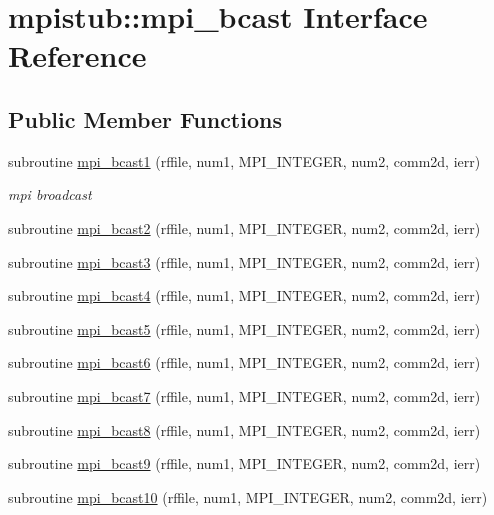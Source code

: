\hypertarget{interfacempistub_1_1mpi__bcast}{}\section{mpistub\+::mpi\+\_\+bcast Interface Reference}
\label{interfacempistub_1_1mpi__bcast}
\subsection*{Public Member Functions}
\begin{DoxyCompactItemize}
\item 
subroutine \mbox{\hyperlink{interfacempistub_1_1mpi__bcast_a8a625c502574a57694e059e09a85905c}{mpi\+\_\+bcast1}} (rffile, num1, M\+P\+I\+\_\+\+I\+N\+T\+E\+G\+ER, num2, comm2d, ierr)
\begin{DoxyCompactList}\small\item\em mpi broadcast \end{DoxyCompactList}\item 
subroutine \mbox{\hyperlink{interfacempistub_1_1mpi__bcast_aaa0cc632dc25d1d3c5757c751024f9b2}{mpi\+\_\+bcast2}} (rffile, num1, M\+P\+I\+\_\+\+I\+N\+T\+E\+G\+ER, num2, comm2d, ierr)
\item 
subroutine \mbox{\hyperlink{interfacempistub_1_1mpi__bcast_af37e70cf2f9c41de612305131cd71d92}{mpi\+\_\+bcast3}} (rffile, num1, M\+P\+I\+\_\+\+I\+N\+T\+E\+G\+ER, num2, comm2d, ierr)
\item 
subroutine \mbox{\hyperlink{interfacempistub_1_1mpi__bcast_add6bd1eed6a7ff5a1068fce9b2711f93}{mpi\+\_\+bcast4}} (rffile, num1, M\+P\+I\+\_\+\+I\+N\+T\+E\+G\+ER, num2, comm2d, ierr)
\item 
subroutine \mbox{\hyperlink{interfacempistub_1_1mpi__bcast_a9bf7b06275e20b4971abba4693dd1212}{mpi\+\_\+bcast5}} (rffile, num1, M\+P\+I\+\_\+\+I\+N\+T\+E\+G\+ER, num2, comm2d, ierr)
\item 
subroutine \mbox{\hyperlink{interfacempistub_1_1mpi__bcast_a96892f1cb686f7bf3423a7446575097d}{mpi\+\_\+bcast6}} (rffile, num1, M\+P\+I\+\_\+\+I\+N\+T\+E\+G\+ER, num2, comm2d, ierr)
\item 
subroutine \mbox{\hyperlink{interfacempistub_1_1mpi__bcast_af6d1436abc2d1806a145cb1d3e01d0e6}{mpi\+\_\+bcast7}} (rffile, num1, M\+P\+I\+\_\+\+I\+N\+T\+E\+G\+ER, num2, comm2d, ierr)
\item 
subroutine \mbox{\hyperlink{interfacempistub_1_1mpi__bcast_ad438171b884dbe068cd99a77b82f0a83}{mpi\+\_\+bcast8}} (rffile, num1, M\+P\+I\+\_\+\+I\+N\+T\+E\+G\+ER, num2, comm2d, ierr)
\item 
subroutine \mbox{\hyperlink{interfacempistub_1_1mpi__bcast_a43c5a5680dd33e3adc78134abee5a2f0}{mpi\+\_\+bcast9}} (rffile, num1, M\+P\+I\+\_\+\+I\+N\+T\+E\+G\+ER, num2, comm2d, ierr)
\item 
subroutine \mbox{\hyperlink{interfacempistub_1_1mpi__bcast_afbe6a3de7de4368e7acb23b227d84cbe}{mpi\+\_\+bcast10}} (rffile, num1, M\+P\+I\+\_\+\+I\+N\+T\+E\+G\+ER, num2, comm2d, ierr)
\end{DoxyCompactItemize}


